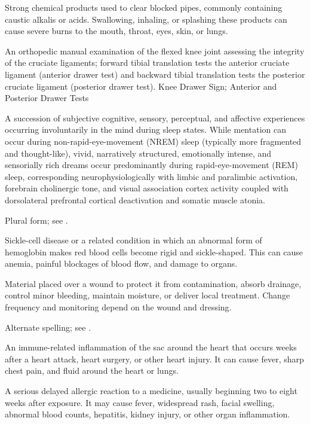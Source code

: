  Strong chemical products used to clear blocked pipes, commonly containing caustic alkalis or acids. Swallowing, inhaling, or splashing these products can cause severe burns to the mouth, throat, eyes, skin, or lungs.

 An orthopedic manual examination of the flexed knee joint assessing the integrity of the cruciate ligaments; forward tibial translation tests the anterior cruciate ligament (anterior drawer test) and backward tibial translation tests the posterior cruciate ligament (posterior drawer test).
\synonyms
Knee Drawer Sign; Anterior and Posterior Drawer Tests

 A succession of subjective cognitive, sensory, perceptual, and affective experiences occurring involuntarily in the mind during sleep states. While mentation can occur during non-rapid-eye-movement (NREM) sleep (typically more fragmented and thought-like), vivid, narratively structured, emotionally intense, and sensorially rich dreams occur predominantly during rapid-eye-movement (REM) sleep, corresponding neurophysiologically with limbic and paralimbic activation, forebrain cholinergic tone, and visual association cortex activity coupled with dorsolateral prefrontal cortical deactivation and somatic muscle atonia.

 Plural form; see .

 Sickle-cell disease or a related condition in which an abnormal form of hemoglobin makes red blood cells become rigid and sickle-shaped. This can cause anemia, painful blockages of blood flow, and damage to organs.

 Material placed over a wound to protect it from contamination, absorb drainage, control minor bleeding, maintain moisture, or deliver local treatment. Change frequency and monitoring depend on the wound and dressing.

 Alternate spelling; see .

 An immune-related inflammation of the sac around the heart that occurs weeks after a heart attack, heart surgery, or other heart injury. It can cause fever, sharp chest pain, and fluid around the heart or lungs.



 A serious delayed allergic reaction to a medicine, usually beginning two to eight weeks after exposure. It may cause fever, widespread rash, facial swelling, abnormal blood counts, hepatitis, kidney injury, or other organ inflammation.

